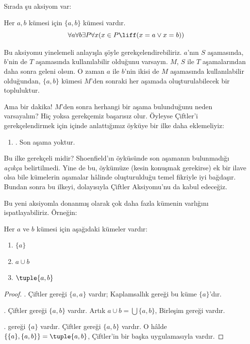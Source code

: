 \documentclass[../../../include/open-logic-section]{subfiles}
\begin{document}

Sırada şu aksiyom var:

\begin{axiom}[Çiftler]
Her $a, b$ kümesi için $\{a, b\}$ kümesi vardır.
\[
	\forall a \forall b \exists P \forall x (x \in P \liff (x = a \lor x = b))
\]
\end{axiom}

Bu aksiyomu yinelemeli anlayışla şöyle gerekçelendirebiliriz. $a$'nın
$S$ aşamasında, $b$'nin de $T$ aşamasında kullanılabilir olduğunu
varsayın. $M$, $S$ ile $T$ aşamalarından daha sonra geleni olsun. O zaman
$a$ ile $b$'nin ikisi de $M$ aşamasında kullanılabilir olduğundan,
$\{a,b\}$ kümesi $M$'den sonraki her aşamada oluşturulabilecek bir
topluluktur.

Ama bir dakika!{} $M$'den sonra herhangi bir aşama bulunduğunu neden
varsayalım? Hiç yoksa gerekçemiz başarısız olur. Öyleyse Çiftler'i
gerekçelendirmek için  içinde anlattığımız
öyküye bir ilke daha eklemeliyiz:
\begin{enumerate}
	\item[] \stagessucc. Son aşama yoktur.
\end{enumerate}
Bu ilke gerekçeli midir? Shoenfield'ın öyküsünde son aşamanın bulunmadığı
\emph{açıkça} belirtilmedi. Yine de bu, öykümüze (kesin konuşmak gerekirse)
ek bir ilave olsa bile kümelerin aşamalar hâlinde oluşturulduğu temel
fikriyle iyi bağdaşır. Bundan sonra bu ilkeyi, dolayısıyla Çiftler
Aksiyomu'nu da kabul edeceğiz.

Bu yeni aksiyomla donanmış olarak çok daha fazla kümenin varlığını
ispatlayabiliriz. Örneğin:

\begin{prop}
Her $a$ ve $b$ kümesi için aşağıdaki kümeler vardır:
	\begin{enumerate}
		\item{} $\{a\}$
		\item{} $a \cup b$
		\item{} $\tuple{a, b}$
	\end{enumerate}
\end{prop}

\begin{proof}
. Çiftler gereği $\{a, a\}$ vardır; Kaplamsallık gereği
bu küme $\{a\}$'dır.

. Çiftler gereği $\{a, b\}$ vardır. Artık
$a \cup b = \bigcup\{a, b\}$, Birleşim gereği vardır.

.  gereği $\{a\}$ vardır. Çiftler gereği
$\{a,b\}$ vardır. O hâlde $\{\{a\}, \{a,b\}\} = \tuple{a,b}$, Çiftler'in
bir başka uygulamasıyla vardır.
\end{proof}
\end{document}
